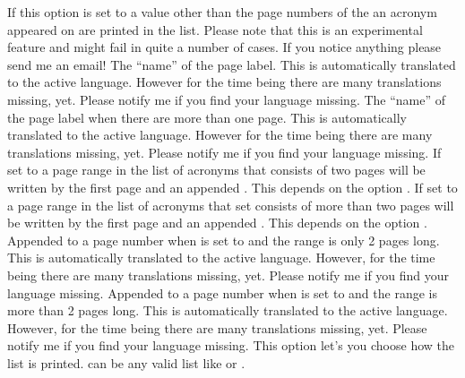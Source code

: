 \documentclass[DIV10,toc=index,toc=bib,hyperfootnotes=false]{cnpkgdoc}
\makeatletter
\providecommand*\sinceversion[1]{%
  \@bsphack
  \marginnote{%
    \footnotesize\sffamily\RaggedRight
    \textcolor{black!75}{Introduced in version~#1}}%
  \@esphack}
\makeatother
\begin{document}
\begin{beschreibung}
   If this option is set to a value other than  the page numbers of
   the an acronym appeared on are printed in the list. Please note that this
   is an experimental feature and might fail in quite a number of cases. If you
   notice anything please send me an email!
   The ``name'' of the page label. This is automatically translated to the
   active language. However for the time being there are many translations
   missing, yet. Please notify me if you find your language missing.
   \sinceversion{1.0}The ``name'' of the page label when there are more than one
   page. This is automatically translated to the active language. However for the
   time being there are many translations missing, yet. Please notify me if you
   find your language missing.
   \sinceversion{1.3}If set to  a page range in the list of acronyms
   that consists of two pages will be written by the first page and an appended
   . This depends on the option .
   \sinceversion{1.3}If set to  a page range in the list of acronyms
   that set consists of more than two pages will be written by the first page
   and an appended . This depends on the option .
   \sinceversion{1.0}Appended to a page number when  is set to
    and the range is only 2 pages long. This is automatically
   translated to the active language. However, for the time being there are many
   translations missing, yet. Please notify me if you find your language missing.
   \sinceversion{1.0}Appended to a page number when  is set to
    and the range is more than 2 pages long. This is automatically
   translated to the active language. However, for the time being there are many
   translations missing, yet. Please notify me if you find your language missing.
   This option let's you choose how the list is printed.  can be any
   valid list like
  or .
\end{beschreibung}
\end{document}
